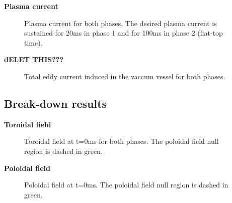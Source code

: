 \documentclass[10pt]{beamer}
\begin{document}

\begin{frame}{\bf Plasma current}
	\begin{figure}[htbp]
		\centering
		\hfill

		\caption{Plasma current for both phases. The desired plasma current is sustained for 20ms in phase 1 and for 100ms in phase 2 (flat-top time).}
	\end{figure}
\end{frame}

\begin{frame}{\bf dELET THIS???}
	\begin{figure}[htbp]
		\centering
		\hfill
		\caption{Total eddy current induced in the vaccum vessel for both phases.}
	\end{figure}
\end{frame}


\subsection{Break-down results}

\begin{frame}{\bf Toroidal field}
	\begin{figure}[htbp]
		\centering
		\hfill
		\caption{Toroidal field at t=0ms for both phases. The poloidal field null region is dashed in green.}
	\end{figure}
\end{frame}


\begin{frame}{\bf Poloidal field}
	\begin{figure}[htbp]
		\centering
		\hfill
		\caption{Poloidal field at t=0ms. The poloidal field null region is dashed in green.}
	\end{figure}
\end{frame}
\end{document}
